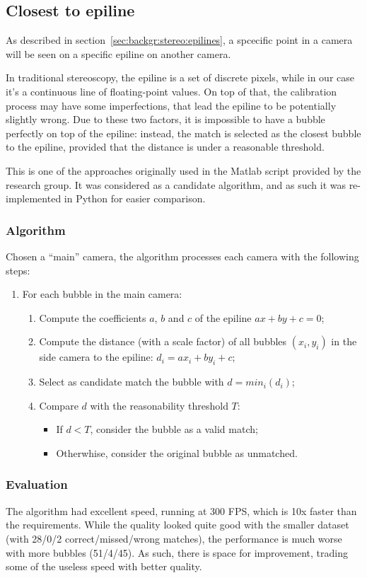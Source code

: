 \subsection{Closest to epiline}
\label{sec:match:epiline}

As described in section~\ref{sec:backgr:stereo:epilines}, a spcecific point in a camera will be seen on a specific epiline on another camera.

In traditional stereoscopy, the epiline is a set of discrete pixels, while in our case it's a continuous line of floating-point values.
On top of that, the calibration process may have some imperfections, that lead the epiline to be potentially slightly wrong.
Due to these two factors, it is impossible to have a bubble perfectly on top of the epiline: instead, the match is selected as the closest bubble to the epiline, provided that the distance is under a reasonable threshold.

This is one of the approaches originally used in the Matlab script provided by the research group.
It was considered as a candidate algorithm, and as such it was re-implemented in Python for easier comparison.

\subsubsection{Algorithm}

Chosen a ``main'' camera, the algorithm processes each camera with the following steps:
\begin{enumerate}
	\itemsep 0em
	\item For each bubble in the main camera:
	      \begin{enumerate}
		      \item Compute the coefficients $a$, $b$ and $c$ of the epiline $ax+by+c{=}0$;
		      \item Compute the distance (with a scale factor) of all bubbles $(x_i, y_i)$ in the side camera to the epiline: $d_i = ax_i + by_i + c$;
		      \item Select as candidate match the bubble with $d=min_i(d_i)$;
		      \item Compare $d$ with the reasonability threshold $T$:
		            \begin{itemize}
			            \item If $d<T$, consider the bubble as a valid match;
			            \item Otherwhise, consider the original bubble as unmatched.
		            \end{itemize}
	      \end{enumerate}
\end{enumerate}

\subsubsection{Evaluation}

The algorithm had excellent speed, running at 300 FPS, which is 10x faster than the requirements.
While the quality looked quite good with the smaller dataset (with 28/0/2 correct/missed/wrong matches), the performance is much worse with more bubbles (51/4/45).
As such, there is space for improvement, trading some of the useless speed with better quality.
